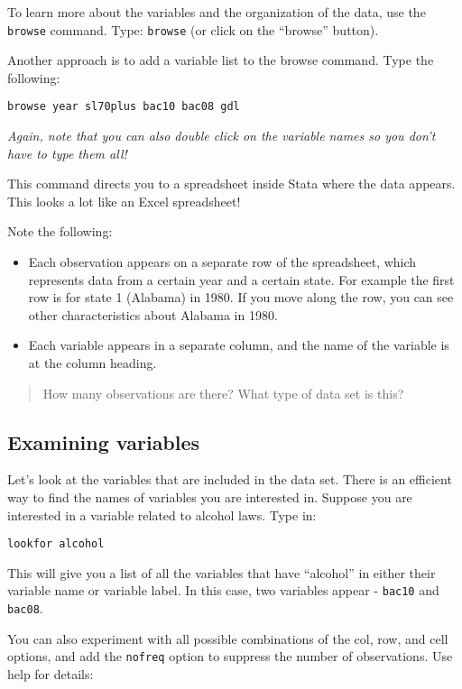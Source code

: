 \documentclass[
]{article}
\begin{document}
To learn more about the variables and the organization of the data, use
the \texttt{browse} command. Type: \texttt{browse} (or click on the
``browse'' button).

Another approach is to add a variable list to the browse command. Type
the following:

\texttt{browse\ year\ sl70plus\ bac10\ bac08\ gdl}

\emph{Again, note that you can also double click on the variable names
so you don't have to type them all!}

This command directs you to a spreadsheet inside Stata where the data
appears. This looks a lot like an Excel spreadsheet!

Note the following:

\begin{itemize}
\item
  Each observation appears on a separate row of the spreadsheet, which
  represents data from a certain year and a certain state. For example
  the first row is for state 1 (Alabama) in 1980. If you move along the
  row, you can see other characteristics about Alabama in 1980.
\item
  Each variable appears in a separate column, and the name of the
  variable is at the column heading.
\end{itemize}

\begin{quote}
How many observations are there? What type of data set is this?
\end{quote}

\hypertarget{examining-variables}{%
\subsection{Examining variables}\label{examining-variables}}

Let's look at the variables that are included in the data set. There is
an efficient way to find the names of variables you are interested in.
Suppose you are interested in a variable related to alcohol laws. Type
in:

\texttt{lookfor\ alcohol}

This will give you a list of all the variables that have ``alcohol'' in
either their variable name or variable label. In this case, two
variables appear - \texttt{bac10} and \texttt{bac08}.

You can also experiment with all possible combinations of the col, row,
and cell options, and add the \texttt{nofreq} option to suppress the
number of observations. Use help for details:
\end{document}
